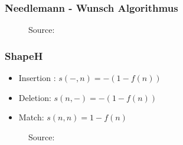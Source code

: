 \documentclass{beamer}
\begin{document}
    \begin{frame}
        \frametitle{Needlemann - Wunsch Algorithmus}
      \begin{figure}[h!]
         \caption{Source: \cite{wiki_nee_wu}}
        \end{figure}
	\end{frame}
	
	\begin{frame}
        \frametitle{ShapeH}
        \begin{minipage}{0.45\textwidth}
            \begin{itemize}
             \item Insertion : $ s(-, n) = -(1 - f(n))$
             \item Deletion: $s(n, -) = -(1 - f(n))$
             \item Match: $s(n, n) = 1 - f(n)$
            \end{itemize}
        \end{minipage}
        \begin{minipage}{0.45\textwidth}
        \begin{figure}[h!]
             \caption{Source: \cite{five_point_two}}
        \end{figure}
        \end{minipage}
	\end{frame}
	
\end{document}

